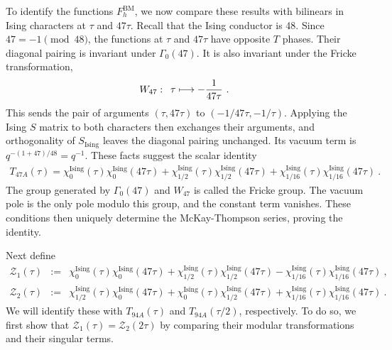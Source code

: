 \documentclass[12pt]{article}
\numberwithin{equation}{section}
\newcommand{\bea}{\begin{eqnarray}}
\newcommand{\eea}{\end{eqnarray}}
\def\no{\nonumber}
\theoremstyle{remark}
\begin{document}
To identify the functions $F^{\mathrm{BM}}_h$, we now compare these results with bilinears in Ising characters at $\tau$ and $47\tau$. Recall that the Ising conductor is 48. Since $47=-1\pmod{48}$, the functions at $\tau$ and $47\tau$ have opposite $T$ phases. Their diagonal pairing is invariant under $\Gamma_0(47)$. It is also invariant under the Fricke transformation, 
\bea
W_{47}:\,\,\,\tau\longmapsto-{1\over47\tau}~.
\eea
This sends the pair of arguments $(\tau,47\tau)$ to $(-1/47\tau,-1/\tau)$. Applying the Ising $S$ matrix to both characters then exchanges their arguments, and orthogonality of $S_{\mathrm{Ising}}$ leaves the diagonal pairing unchanged. Its vacuum term is $q^{-(1+47)/48}=q^{-1}$. These facts suggest the scalar identity
\bea 
\label{eq:BabyScalarFirst}
T_{47A}(\tau)=\chi^{\mathrm{Ising}}_0(\tau)\chi^{\mathrm{Ising}}_0(47\tau)+\chi^{\mathrm{Ising}}_{1/2}(\tau)\chi^{\mathrm{Ising}}_{1/2}(47\tau)+\chi^{\mathrm{Ising}}_{1/16}(\tau)\chi^{\mathrm{Ising}}_{1/16}(47\tau)~.
\eea
The group generated by $\Gamma_0(47)$ and $W_{47}$ is called the Fricke group. The vacuum pole is the only pole modulo this group, and the constant term vanishes. These conditions then uniquely determine the McKay-Thompson series, proving the identity.

Next define
\bea
\mathcal Z_1(\tau)&:=&\chi^{\mathrm{Ising}}_0(\tau)\chi^{\mathrm{Ising}}_0(47\tau)+\chi^{\mathrm{Ising}}_{1/2}(\tau)\chi^{\mathrm{Ising}}_{1/2}(47\tau)-\chi^{\mathrm{Ising}}_{1/16}(\tau)\chi^{\mathrm{Ising}}_{1/16}(47\tau)~,\no\\
\mathcal Z_2(\tau)&:=&\chi^{\mathrm{Ising}}_{1/2}(\tau)\chi^{\mathrm{Ising}}_0(47\tau)+\chi^{\mathrm{Ising}}_0(\tau)\chi^{\mathrm{Ising}}_{1/2}(47\tau)+\chi^{\mathrm{Ising}}_{1/16}(\tau)\chi^{\mathrm{Ising}}_{1/16}(47\tau)~.
\eea
We will identify these with $T_{94A}(\tau)$ and $T_{94A}(\tau/2)$, respectively. To do so, we first show that $\mathcal Z_1(\tau)=\mathcal Z_2(2\tau)$ by comparing their modular transformations and their singular terms.
\end{document}
